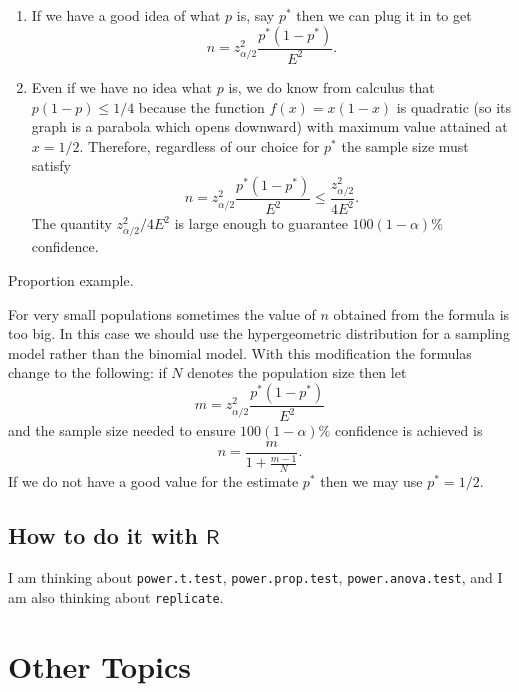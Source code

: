 \begin{enumerate}
\item If we have a good idea of what \(p\) is, say \(p^{\ast}\) then we
can plug it in to get
\begin{equation}
n=z_{\alpha/2}^{2}\frac{p^{\ast}(1-p^{\ast})}{E^{2}}.
\end{equation}
\item Even if we have no idea what \(p\) is, we do know from calculus
that \(p(1-p)\leq1/4\) because the function \(f(x)=x(1-x)\) is
quadratic (so its graph is a parabola which opens downward) with
maximum value attained at \(x=1/2\). Therefore, regardless of our
choice for \(p^{\ast}\) the sample size must satisfy
\begin{equation}
n=z_{\alpha/2}^{2}\frac{p^{\ast}(1-p^{\ast})}{E^{2}}\leq\frac{z_{\alpha/2}^{2}}{4E^{2}}.
\end{equation}
The quantity \(z_{\alpha/2}^{2}/4E^{2}\) is large enough to
guarantee \(100(1-\alpha)\%\) confidence.
\end{enumerate}


Proportion example.

\begin{rem}
For very small populations sometimes the value of \(n\) obtained from
the formula is too big. In this case we should use the hypergeometric
distribution for a sampling model rather than the binomial model. With
this modification the formulas change to the following: if \(N\)
denotes the population size then let
\begin{equation}
m=z_{\alpha/2}^{2}\frac{p^{\ast}(1-p^{\ast})}{E^{2}}
\end{equation}
and the sample size needed to ensure \(100(1-\alpha)\%\) confidence is
achieved is
\begin{equation}
n=\frac{m}{1+\frac{m-1}{N}}.
\end{equation}
If we do not have a good value for the estimate \(p^{\ast}\) then we may use \(p^{\ast}=1/2\).
\end{rem}

\subsection{How to do it with \(\mathsf{R}\)}
\label{sec-9-7-1}
I am thinking about \texttt{power.t.test}, \texttt{power.prop.test},
\texttt{power.anova.test}, and I am also thinking about \texttt{replicate}.

\section{Other Topics}
\label{sec-9-8}

